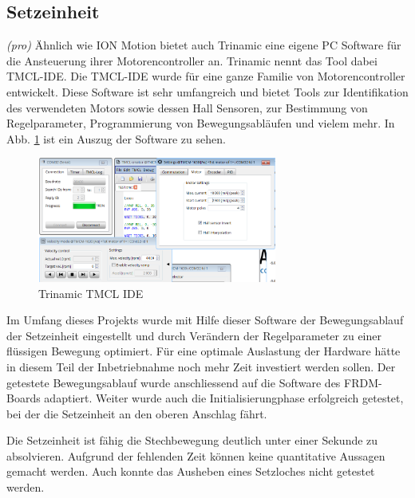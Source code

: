 \subsection{Setzeinheit} \label{sec:Inbetriebnahme_Setzeinheit}
\textit{(pro)} Ähnlich wie ION Motion bietet auch Trinamic eine eigene PC Software für die Ansteuerung ihrer Motorencontroller an. Trinamic nennt das Tool dabei TMCL-IDE. Die TMCL-IDE wurde für eine ganze Familie von Motorencontroller entwickelt. Diese Software ist sehr umfangreich und bietet Tools zur Identifikation des verwendeten Motors sowie dessen Hall Sensoren, zur Bestimmung von Regelparameter, Programmierung von Bewegungsabläufen und vielem mehr. In Abb. \ref{fig:TMCL-IDE} ist ein Auszug der Software zu sehen.

\begin{figure}[H]
	\includegraphics[width=0.7\textwidth]{Illustrationen/7-Inbetriebnahme_und_Kalibration/TMCL_IDE.png}
	\caption{Trinamic TMCL IDE}
	\label{fig:TMCL-IDE}
\end{figure}

Im Umfang dieses Projekts wurde mit Hilfe dieser Software der Bewegungsablauf der Setzeinheit eingestellt und durch Verändern der Regelparameter zu einer flüssigen Bewegung optimiert. Für eine optimale Auslastung der Hardware hätte in diesem Teil der Inbetriebnahme noch mehr Zeit investiert werden sollen. Der getestete Bewegungsablauf wurde anschliessend auf die Software des FRDM-Boards adaptiert. Weiter wurde auch die Initialisierungphase erfolgreich getestet, bei der die Setzeinheit an den oberen Anschlag fährt.

Die Setzeinheit ist fähig die Stechbewegung deutlich unter einer Sekunde zu absolvieren. Aufgrund der fehlenden Zeit können keine quantitative Aussagen gemacht werden. Auch konnte das Ausheben eines Setzloches nicht getestet werden.

